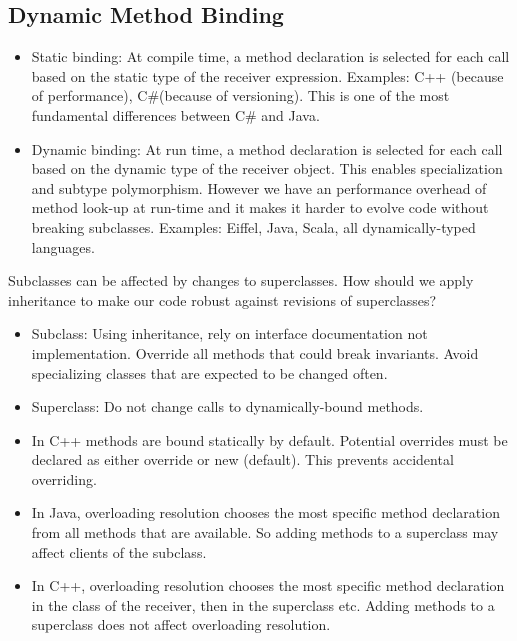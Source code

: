 \subsection{Dynamic Method Binding}
\begin{mytitle}\hfill
\begin{itemize}
    \item Static binding: At compile time, a method declaration is selected for each call based on the static type of the receiver expression. Examples: C++ (because of performance), C\#(because of versioning). This is one of the most fundamental differences between C\# and Java.
    \item Dynamic binding: At run time, a method declaration is selected for each call based on the dynamic type of the receiver object. This enables specialization and subtype polymorphism. However we have an performance overhead of method look-up at run-time and it makes it harder to evolve code without breaking subclasses. Examples: Eiffel, Java, Scala, all dynamically-typed languages.
\end{itemize}
\end{mytitle}
\begin{mytitle} Subclasses can be affected by changes to superclasses. How should we apply inheritance to make our code robust against revisions of superclasses?
\begin{itemize}
    \item Subclass: Using inheritance, rely on interface documentation not implementation. Override all methods that could break invariants. Avoid specializing classes that are expected to be changed often.
    \item Superclass: Do not change calls to dynamically-bound methods.
    \item In C++ methods are bound statically by default. Potential overrides must be declared as either override or new (default). This prevents accidental overriding. 
\end{itemize}
\end{mytitle}
\begin{mytitle}[Overloading]\hfill
\begin{itemize}
    \item In Java, overloading resolution chooses the most specific method declaration from all methods that are available. So adding methods to a superclass may affect clients of the subclass.
    \item In C++, overloading resolution chooses the most specific method declaration in the class of the receiver, then in the superclass etc. Adding methods to a superclass does not affect overloading resolution.
\end{itemize}
\end{mytitle}
